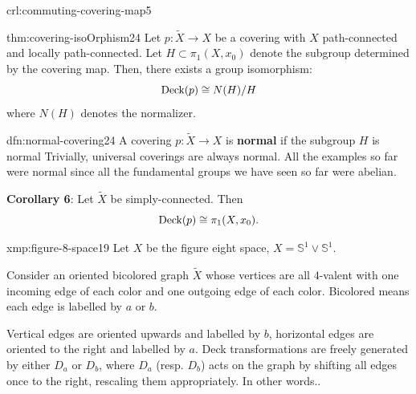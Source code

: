 \documentclass[landscape, 8pt]{extarticle}
\begin{document}
\begin{multicols*}{3}
\begin{crl}{crl:commuting-covering-map}{5}
\end{crl}

\begin{thm}{thm:covering-isoOrphism}{24}
	Let $p : \tilde{X} \to X$ be a covering with $X$ path-connected and locally path-connected. Let $H \subset \pi_{1}(X, x_{0})$ denote the subgroup determined by the covering map. Then, there exists a group isomorphism:
	\vspace{-3pt}
	\[\operatorname{Deck}(p) \cong N(H) /H\]
	where $N(H)$ denotes the normalizer.
\end{thm}

\begin{dfn}{dfn:normal-covering}{24}
	A covering $p : \tilde{X} \to X$ is \textbf{normal} if the subgroup $H$ is normal
	\tcbline
	Trivially, universal coverings are always normal. All the examples so far were normal since all the fundamental groups we have seen so far were abelian.

	\tcbline
	\textbf{Corollary 6}: Let $\tilde{X}$ be simply-connected. Then
	\[\operatorname{Deck}(p) \cong \pi_{1}(X, x_{0}).\]
\end{dfn}

\begin{xmp}{xmp:figure-8-space}{19}
	\vspace{-2pt}
	Let $X$ be the figure eight space, $X = \mathbb{S}^{1} \vee \mathbb{S}^{1}$.

	Consider an oriented bicolored graph $\tilde{X}$ whose vertices are all $4$-valent with one incoming edge of each color and one outgoing edge of each color. Bicolored means each edge is labelled by $a$ or $b$. 	

	Vertical edges are oriented upwards and labelled by $b$, horizontal edges are oriented to the right and labelled by $a$. Deck transformations are freely generated by either $D_{a}$ or $D_{b}$, where $D_{a}$ (resp. $D_{b}$) acts on the graph by shifting all edges once to the right, rescaling them appropriately. In other words..
\end{xmp}


\end{multicols*}
\end{document}
